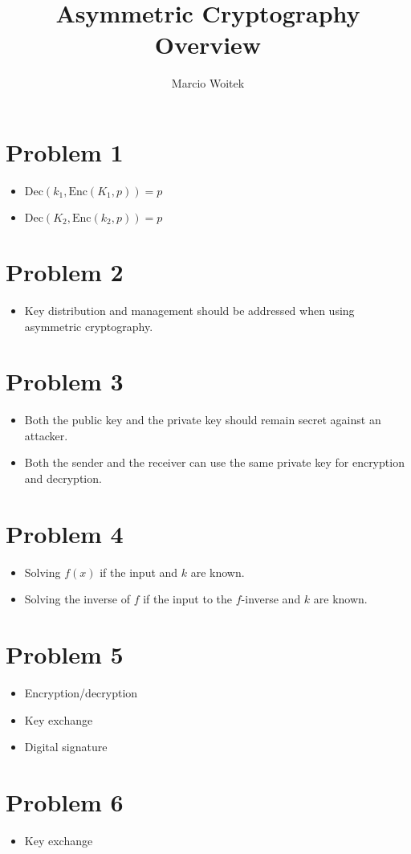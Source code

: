 \documentclass[11pt]{article}
\author{Marcio Woitek}
\date{}
\title{Asymmetric Cryptography Overview}
\newcommand{\enc}{\mathrm{Enc}}
\newcommand{\dec}{\mathrm{Dec}}
\begin{document}
\maketitle
\thispagestyle{empty}
\pagestyle{empty}

\section*{Problem 1}
\label{sec:org300835e}
\begin{itemize}
\item \(\dec(k_1,\enc(K_1,p))=p\)
\item \(\dec(K_2,\enc(k_2,p))=p\)
\end{itemize}

\section*{Problem 2}
\label{sec:org3e78536}
\begin{itemize}
\item Key distribution and management should be addressed when using asymmetric
cryptography.
\end{itemize}

\section*{Problem 3}
\label{sec:orgadfeb34}
\begin{itemize}
\item Both the public key and the private key should remain secret against an
attacker.
\item Both the sender and the receiver can use the same private key for encryption
and decryption.
\end{itemize}

\section*{Problem 4}
\label{sec:org6a3f707}
\begin{itemize}
\item Solving \(f(x)\) if the input and \(k\) are known.
\item Solving the inverse of \(f\) if the input to the \(f\)-inverse and \(k\) are
known.
\end{itemize}

\section*{Problem 5}
\label{sec:orgc5191a2}
\begin{itemize}
\item Encryption/decryption
\item Key exchange
\item Digital signature
\end{itemize}

\section*{Problem 6}
\label{sec:org562cf46}
\begin{itemize}
\item Key exchange
\end{itemize}
\end{document}
